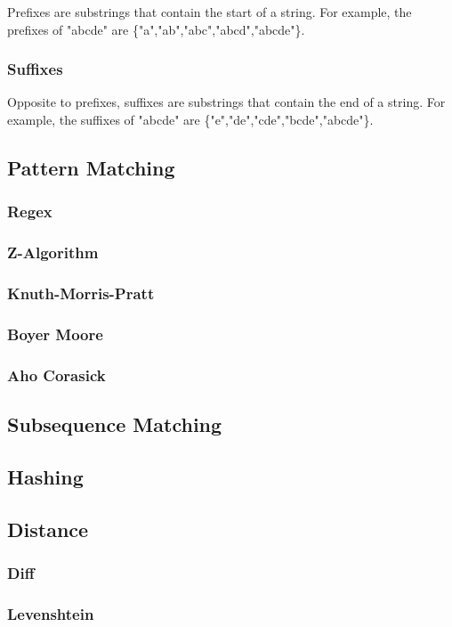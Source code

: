 Prefixes are substrings that contain the start of a string. For example, the prefixes of "abcde" are \{"a","ab","abc","abcd","abcde"\}.

\subsubsection{Suffixes}

Opposite to prefixes, suffixes are substrings that contain the end of a string. For example, the suffixes of "abcde" are \{"e","de","cde","bcde","abcde"\}.

\subsection{Pattern Matching}
\subsubsection{Regex}
\subsubsection{Z-Algorithm}
\subsubsection{Knuth-Morris-Pratt}
\subsubsection{Boyer Moore}
\subsubsection{Aho Corasick}
\subsection{Subsequence Matching}
\subsection{Hashing}
\subsection{Distance}
\subsubsection{Diff}
\subsubsection{Levenshtein}